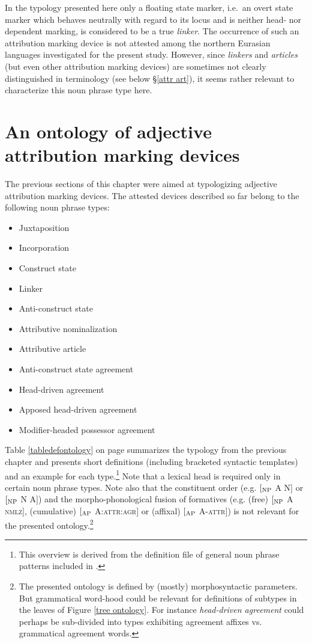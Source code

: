 In the typology presented here only a floating state marker, i.e.~an overt state marker which behaves neutrally with regard to its locus and is neither head- nor dependent marking, is considered to be a true \emph{linker}. The occurrence of such an attribution marking device is not attested among the northern Eurasian languages investigated for the present study. However, since \emph{linkers} and \emph{articles} (but even other attribution marking devices) are sometimes not clearly distinguished in terminology (see below \S\ref{attr art}), it seems rather relevant to characterize this noun phrase type here.


\section[Ontology of attribution marking]{An ontology of adjective attribution marking devices}
The previous sections of this chapter were aimed at typologizing adjective attribution marking devices. The attested devices described so far belong to the following noun phrase types:
\begin{itemize}
\item{Juxtaposition}
\item{Incorporation}
\item{Construct state}
\item{Linker}
\item{Anti-construct state}
\item{Attributive nominalization}
\item{Attributive article}
\item{Anti-construct state agreement}
\item{Head-driven agreement}
\item{Apposed head-driven agreement}
\item{Modifier-headed possessor agreement}
\end{itemize}
Table \ref{tabledefontology} on page \pageref{tabledefontology} summarizes the typology from the previous chapter and presents short definitions (including bracketed syntactic templates) and an example for each type.\footnote{This overview is derived from the definition file of general noun phrase patterns included in \citet{AUTOTYP-NP}.} Note that a lexical head is required only in certain noun phrase types. Note also that the constituent order (e.g. $[_{\rm NP}$ A N$]$ or $[_{\rm NP}$ N A$]$) and the morpho-phonological fusion of formatives (e.g. (free) $[_{\rm NP}$ A \textsc{nmlz}$]$, (cumulative) $[_{\rm AP}$ A:\textsc{attr:agr}$]$ or (affixal) $[_{\rm AP}$ A-\textsc{attr}$]$) is not relevant for the presented ontology.\footnote{The presented ontology is defined by (mostly) morphosyntactic parameters. But grammatical word-hood could be relevant for definitions of subtypes in the leaves of Figure \ref{tree ontology}. For instance {\it head-driven agreement} could perhaps be sub-divided into types exhibiting agreement affixes vs. grammatical agreement words.}

